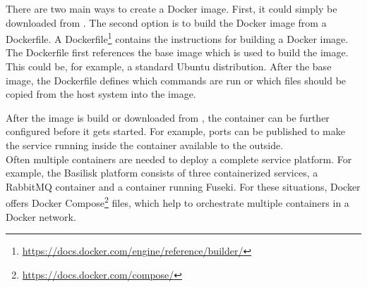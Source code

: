 There are two main ways to create a Docker image.
First, it could simply be downloaded from \dockh{}.
The second option is to build the Docker image from a Dockerfile.
A Dockerfile\footnote{\url{https://docs.docker.com/engine/reference/builder/}} contains the instructions for building a Docker image.
The Dockerfile first references the base image which is used to build the image.
This could be, for example, a standard Ubuntu distribution.
After the base image, the Dockerfile defines which commands are run or which files should be copied from the host system into the image.

After the image is build or downloaded from \dockh{}, the container can be further configured before it gets started.
For example, ports can be published to make the service running inside the container available to the outside.
\\

Often multiple containers are needed to deploy a complete service platform.
For example, the Basilisk platform consists of three containerized services, a RabbitMQ container and a container running Fuseki.
For these situations, Docker offers Docker Compose\footnote{\url{https://docs.docker.com/compose/}} files, which help to orchestrate multiple containers in a Docker network.



